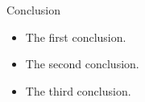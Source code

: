 \documentclass[final]{beamer}
\begin{document}
\begin{frame}{}
\begin{columns}[t]
\begin{column}{.59\linewidth}
			\begin{block}{Conclusion}
				\begin{itemize}
					\item The first conclusion.
					\item The second conclusion.
					\item The third conclusion.
				\end{itemize}
			\end{block}  %
			
		\end{column}  %
		
	\end{columns}  %
	
	\vfill
	
\end{frame}
\end{document}
